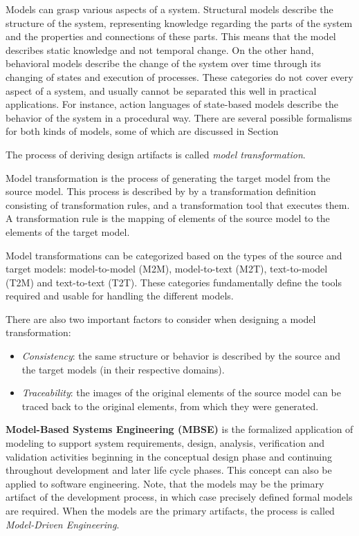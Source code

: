 Models can grasp various aspects of a system. Structural models describe the structure of the system, representing knowledge regarding the parts of the system and the properties and connections of these parts. This means that the model describes static knowledge and not temporal change. On the other hand, behavioral models describe the change of the system over time through its changing of states and execution of processes. These categories do not cover every aspect of a system, and usually cannot be separated this well in practical applications. For instance, action languages of state-based models describe the behavior of the system in a procedural way. There are several possible formalisms for both kinds of models, some of which are discussed in Section %

The process of deriving design artifacts is called \textit{model transformation}.
\begin{definition}
	Model transformation is the process of generating the target model from the source model. This process is described by by a transformation definition consisting of transformation rules, and a transformation tool that executes them. A transformation rule is the mapping of elements of the source model to the elements of the target model. \cite{ModelTransformation}
\end{definition}

Model transformations can be categorized based on the types of the source and target models: model-to-model (M2M), model-to-text (M2T), text-to-model (T2M) and text-to-text (T2T). These categories fundamentally define the tools required and usable for handling the different models.

There are also two important factors to consider when designing a model transformation: 
\begin{itemize}
	\item \textit{Consistency}: the same structure or behavior is described by the source and the target models (in their respective domains).
	\item \textit{Traceability}: the images of the original elements of the source model can be traced back to the original elements, from which they were generated.
\end{itemize}

\textbf{Model-Based Systems Engineering (MBSE)} is the formalized application of modeling to support system requirements, design, analysis, verification and validation activities beginning in the conceptual design phase and continuing throughout development and later life cycle phases\cite{mbse}. This concept can also be applied to software engineering. Note, that the models may be the primary artifact of the development process, in which case precisely defined formal models are required. When the models are the primary artifacts, the process is called \textit{Model-Driven Engineering}.


